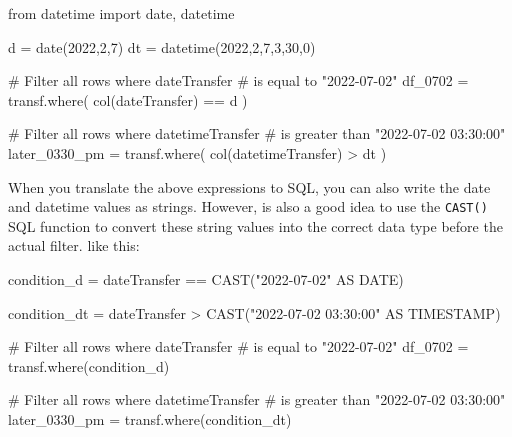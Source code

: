 \documentclass[
  11pt,
  letterpaper,
  DIV=11,
  numbers=noendperiod]{scrreprt}
\newenvironment{Shaded}{\begin{snugshade}}{\end{snugshade}}
\newcommand{\CommentTok}[1]{\textcolor[rgb]{0.37,0.37,0.37}{#1}}
\newcommand{\DecValTok}[1]{\textcolor[rgb]{0.68,0.00,0.00}{#1}}
\newcommand{\ImportTok}[1]{\textcolor[rgb]{0.00,0.46,0.62}{#1}}
\newcommand{\NormalTok}[1]{\textcolor[rgb]{0.00,0.23,0.31}{#1}}
\newcommand{\OperatorTok}[1]{\textcolor[rgb]{0.37,0.37,0.37}{#1}}
\newcommand{\StringTok}[1]{\textcolor[rgb]{0.13,0.47,0.30}{#1}}
\begin{document}
\begin{Shaded}
\begin{Highlighting}[]
\ImportTok{from}\NormalTok{ datetime }\ImportTok{import}\NormalTok{ date, datetime}

\NormalTok{d }\OperatorTok{=}\NormalTok{ date(}\DecValTok{2022}\NormalTok{,}\DecValTok{2}\NormalTok{,}\DecValTok{7}\NormalTok{)}
\NormalTok{dt }\OperatorTok{=}\NormalTok{ datetime(}\DecValTok{2022}\NormalTok{,}\DecValTok{2}\NormalTok{,}\DecValTok{7}\NormalTok{,}\DecValTok{3}\NormalTok{,}\DecValTok{30}\NormalTok{,}\DecValTok{0}\NormalTok{)}

\CommentTok{\# Filter all rows where \textasciigrave{}dateTransfer\textasciigrave{}}
\CommentTok{\# is equal to "2022{-}07{-}02"}
\NormalTok{df\_0702 }\OperatorTok{=}\NormalTok{ transf.where(}
\NormalTok{    col(}\StringTok{\textquotesingle{}dateTransfer\textquotesingle{}}\NormalTok{) }\OperatorTok{==}\NormalTok{ d}
\NormalTok{)}

\CommentTok{\# Filter all rows where \textasciigrave{}datetimeTransfer\textasciigrave{}}
\CommentTok{\# is greater than "2022{-}07{-}02 03:30:00"}
\NormalTok{later\_0330\_pm }\OperatorTok{=}\NormalTok{ transf.where(}
\NormalTok{    col(}\StringTok{\textquotesingle{}datetimeTransfer\textquotesingle{}}\NormalTok{) }\OperatorTok{\textgreater{}}\NormalTok{ dt}
\NormalTok{)}
\end{Highlighting}
\end{Shaded}

When you translate the above expressions to SQL, you can also write the
date and datetime values as strings. However, is also a good idea to use
the \texttt{CAST()} SQL function to convert these string values into the
correct data type before the actual filter. like this:

\begin{Shaded}
\begin{Highlighting}[]
\NormalTok{condition\_d }\OperatorTok{=} \StringTok{\textquotesingle{}\textquotesingle{}\textquotesingle{}}
\StringTok{dateTransfer == CAST("2022{-}07{-}02" AS DATE)}
\StringTok{\textquotesingle{}\textquotesingle{}\textquotesingle{}}

\NormalTok{condition\_dt }\OperatorTok{=} \StringTok{\textquotesingle{}\textquotesingle{}\textquotesingle{}}
\StringTok{dateTransfer \textgreater{} CAST("2022{-}07{-}02 03:30:00" AS TIMESTAMP)}
\StringTok{\textquotesingle{}\textquotesingle{}\textquotesingle{}}

\CommentTok{\# Filter all rows where \textasciigrave{}dateTransfer\textasciigrave{}}
\CommentTok{\# is equal to "2022{-}07{-}02"}
\NormalTok{df\_0702 }\OperatorTok{=}\NormalTok{ transf.where(condition\_d)}

\CommentTok{\# Filter all rows where \textasciigrave{}datetimeTransfer\textasciigrave{}}
\CommentTok{\# is greater than "2022{-}07{-}02 03:30:00"}
\NormalTok{later\_0330\_pm }\OperatorTok{=}\NormalTok{ transf.where(condition\_dt)}
\end{Highlighting}
\end{Shaded}
\end{document}
